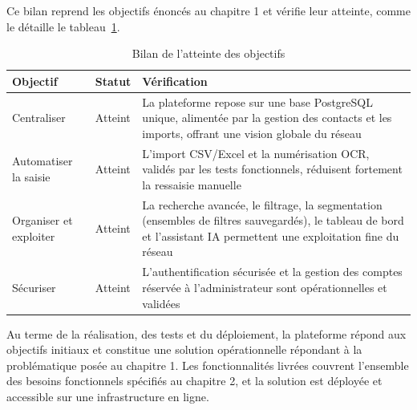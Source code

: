 Ce bilan reprend les objectifs énoncés au chapitre 1 et vérifie leur atteinte, comme le détaille le tableau~\ref{tab:bilan}.

\begin{table}[H]
\centering
\small
\begin{tabularx}{\textwidth}{|l|l|X|}
\hline
\textbf{Objectif} & \textbf{Statut} & \textbf{Vérification} \\
\hline
Centraliser & Atteint & La plateforme repose sur une base PostgreSQL unique, alimentée par la gestion des contacts et les imports, offrant une vision globale du réseau \\
\hline
Automatiser la saisie & Atteint & L'import CSV/Excel et la numérisation \ac{OCR}, validés par les tests fonctionnels, réduisent fortement la ressaisie manuelle \\
\hline
Organiser et exploiter & Atteint & La recherche avancée, le filtrage, la segmentation (ensembles de filtres sauvegardés), le tableau de bord et l'assistant IA permettent une exploitation fine du réseau \\
\hline
Sécuriser & Atteint & L'authentification sécurisée et la gestion des comptes réservée à l'administrateur sont opérationnelles et validées \\
\hline
\end{tabularx}
\caption{Bilan de l'atteinte des objectifs}
\label{tab:bilan}
\end{table}

Au terme de la réalisation, des tests et du déploiement, la plateforme répond aux objectifs initiaux et constitue une solution opérationnelle répondant à la problématique posée au chapitre 1. Les fonctionnalités livrées couvrent l'ensemble des besoins fonctionnels spécifiés au chapitre 2, et la solution est déployée et accessible sur une infrastructure en ligne.
